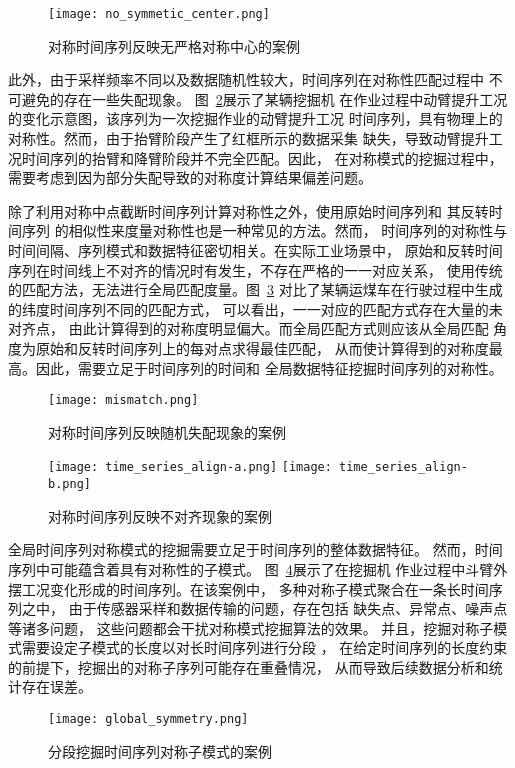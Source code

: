 \begin{figure}[h]
  \centering
  \texttt{[image: no\_symmetic\_center.png]}
  \caption{对称时间序列反映无严格对称中心的案例}
  \label{fig:no_symmetic_center}
\end{figure}

此外，由于采样频率不同以及数据随机性较大，时间序列在对称性匹配过程中
不可避免的存在一些失配现象\cite{DBLP:journals/corr/abs-2202-05403}。
图~\ref{fig:mismatch}展示了某辆挖掘机
在作业过程中动臂提升工况的变化示意图，该序列为一次挖掘作业的动臂提升工况
时间序列，具有物理上的对称性。然而，由于抬臂阶段产生了红框所示的数据采集
缺失，导致动臂提升工况时间序列的抬臂和降臂阶段并不完全匹配。因此，
在对称模式的挖掘过程中，需要考虑到因为部分失配导致的对称度计算结果偏差问题。

除了利用对称中点截断时间序列计算对称性之外，使用原始时间序列和
其反转时间序列\cite{DBLP:journals/entropy/ChvostekovaJK21}
的相似性来度量对称性也是一种常见的方法。然而，
时间序列的对称性与时间间隔、序列模式和数据特征密切相关。在实际工业场景中，
原始和反转时间序列在时间线上不对齐的情况时有发生，不存在严格的一一对应关系，
使用传统的匹配方法，无法进行全局匹配度量。图~\ref{fig:time_series_align}
对比了某辆运煤车在行驶过程中生成的纬度时间序列不同的匹配方式，
可以看出，一一对应的匹配方式存在大量的未对齐点，
由此计算得到的对称度明显偏大。而全局匹配方式则应该从全局匹配
角度为原始和反转时间序列上的每对点求得最佳匹配，
从而使计算得到的对称度最高。因此，需要立足于时间序列的时间和
全局数据特征挖掘时间序列的对称性。
\begin{figure}
  \centering
  \texttt{[image: mismatch.png]}
  \caption{对称时间序列反映随机失配现象的案例}
  \label{fig:mismatch}
\end{figure}
\begin{figure}
  \centering
    {\texttt{[image: time\_series\_align-a.png]}}
    {\texttt{[image: time\_series\_align-b.png]}}
  \caption{对称时间序列反映不对齐现象的案例}
  \label{fig:time_series_align}
\end{figure}

全局时间序列对称模式的挖掘需要立足于时间序列的整体数据特征。
然而，时间序列中可能蕴含着具有对称性的子模式。
图~\ref{fig:segement_symmetric_pattern}展示了在挖掘机
作业过程中斗臂外摆工况变化形成的时间序列。在该案例中，
多种对称子模式聚合在一条长时间序列之中，
由于传感器采样和数据传输的问题，存在包括
缺失点、异常点、噪声点等诸多问题\cite{DBLP:conf/sigmod/SongZWY15}，
这些问题都会干扰对称模式挖掘算法的效果。
并且，挖掘对称子模式需要设定子模式的长度以对长时间序列进行分段
\cite{DBLP:journals/tist/MuralidharTCCRP20}，
在给定时间序列的长度约束的前提下，挖掘出的对称子序列可能存在重叠情况，
从而导致后续数据分析和统计存在误差。
\begin{figure}
  \centering
  \texttt{[image: global\_symmetry.png]}
  \caption{分段挖掘时间序列对称子模式的案例}
  \label{fig:segement_symmetric_pattern}
\end{figure}

